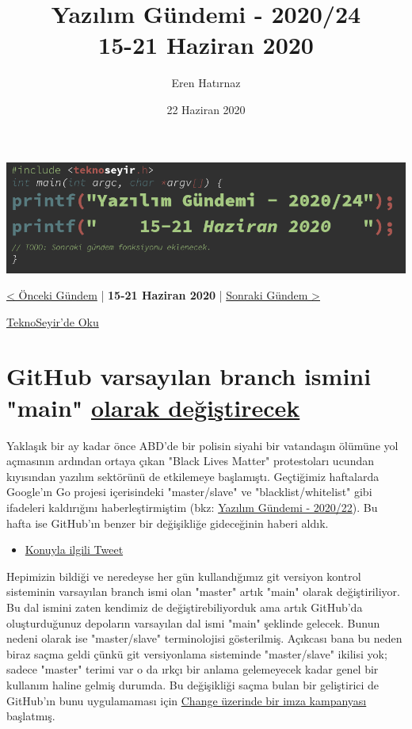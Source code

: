\documentclass[11pt]{article}
\author{Eren Hatırnaz}
\date{22 Haziran 2020}
\title{Yazılım Gündemi - 2020/24\\\medskip
\large 15-21 Haziran 2020}
\begin{document}
\maketitle
\tableofcontents \clearpage\shorthandoff{=}

\begin{center}
\includegraphics[width=.9\linewidth]{gorseller/yazilim-gundemi-banner.png}
\end{center}

\begin{center}
\href{../23/yazilim-gundemi-2020-23.pdf}{< Önceki Gündem} | \textbf{15-21 Haziran 2020} | \href{../25/yazilim-gundemi-2020-25.pdf}{Sonraki Gündem >}

\href{https://teknoseyir.com/blog/yazilim-gundemi-2020-24}{TeknoSeyir'de Oku}
\end{center}

\section{GitHub varsayılan branch ismini "main" \href{https://www.bbc.com/news/technology-53050955}{olarak değiştirecek}}
\label{sec:org3defc67}
Yaklaşık bir ay kadar önce ABD'de bir polisin siyahi bir vatandaşın ölümüne
yol açmasının ardından ortaya çıkan "Black Lives Matter" protestoları ucundan
kıyısından yazılım sektörünü de etkilemeye başlamıştı. Geçtiğimiz haftalarda
Google'ın Go projesi içerisindeki "master/slave" ve "blacklist/whitelist" gibi
ifadeleri kaldırığını haberleştirmiştim (bkz: \href{../22/yazilim-gundemi-2020-22.pdf}{Yazılım Gündemi - 2020/22}). Bu
hafta ise GitHub'ın benzer bir değişikliğe gideceğinin haberi aldık.

\begin{itemize}
\item \href{https://twitter.com/natfriedman/status/1271253144442253312}{Konuyla ilgili Tweet}
\end{itemize}

Hepimizin bildiği ve neredeyse her gün kullandığımız git versiyon kontrol
sisteminin varsayılan branch ismi olan "master" artık "main" olarak
değiştiriliyor. Bu dal ismini zaten kendimiz de değiştirebiliyorduk ama artık
GitHub'da oluşturduğunuz depoların varsayılan dal ismi "main" şeklinde
gelecek. Bunun nedeni olarak ise "master/slave" terminolojisi gösterilmiş.
Açıkcası bana bu neden biraz saçma geldi çünkü git versiyonlama sisteminde
"master/slave" ikilisi yok; sadece "master" terimi var o da ırkçı bir anlama
gelemeyecek kadar genel bir kullanım haline gelmiş durumda. Bu değişikliği
saçma bulan bir geliştirici de GitHub'ın bunu uygulamaması için \href{https://www.change.org/p/github-we-don-t-need-to-rename-the-master-branch-on-git}{Change
üzerinde bir imza kampanyası} başlatmış.
\end{document}
